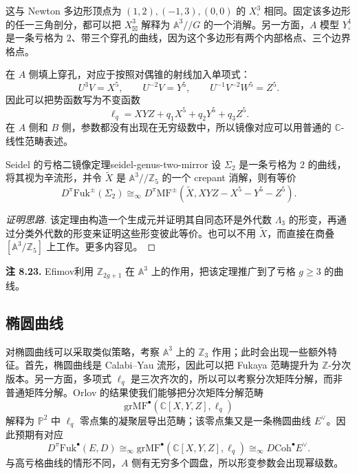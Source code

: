这与 Newton 多边形顶点为 $(1,2),(-1,3),(0,0)$ 的 $X^3_\square$ 相同。固定该多边形的任一三角剖分，都可以把 $X^3_{\boxtimes}$ 解释为 $\mathbb A^3//G$ 的一个消解。另一方面，$A$ 模型 $Y^1_\square$ 是一条亏格为 $2$、带三个穿孔的曲线，因为这个多边形有两个内部格点、三个边界格点。

在 $A$ 侧填上穿孔，对应于按照对偶锥的射线加入单项式：
\[
  U^3V=X^5,\qquad U^{-2}V=Y^5,\qquad
  U^{-1}V^{-2}W^5=Z^5.
\]
因此可以把势函数写为不变函数
\[
  \ell_q=XYZ+q_1X^5+q_2Y^5+q_3Z^5.
\]
在 $A$ 侧和 $B$ 侧，参数都没有出现在无穷级数中，所以镜像对应可以用普通的 $\mathbb C$-线性范畴表述。

\begin{theorem}{Seidel 的亏格二镜像定理}{seidel-genus-two-mirror}
设 $\Sigma_2$ 是一条亏格为 $2$ 的曲线，将其视为辛流形，并令 $\widetilde X$ 是 $\mathbb A^3//\mathbb Z_5$ 的一个 crepant 消解，则有等价
\[
  D^\pi\mathrm{Fuk}^{\pm}(\Sigma_2)
  \cong_\infty D^\pi\mathrm{MF}^{\pm}
  (\widetilde X,XYZ-X^5-Y^5-Z^5).
\]
\end{theorem}
\begin{proof}[证明思路]
该定理由构造一个生成元并证明其自同态环是外代数 $\Lambda_3$ 的形变，再通过分类外代数的形变来证明这些形变彼此等价。也可以不用 $\widetilde X$，而直接在商叠 $[\mathbb A^3/\mathbb Z_5]$ 上工作。更多内容见。
\end{proof}

\begin{note}\label{note:efimov-higher-genus}
\textbf{注 8.23.} Efimov利用 $\mathbb Z_{2g+1}$ 在 $\mathbb A^3$ 上的作用，把该定理推广到了亏格 $g\geq3$ 的曲线。
\end{note}

\subsection*{椭圆曲线}
对椭圆曲线可以采取类似策略，考察 $\mathbb A^3$ 上的 $\mathbb Z_3$ 作用；此时会出现一些额外特征。首先，椭圆曲线是 Calabi--Yau 流形，因此可以把 Fukaya 范畴提升为 $\mathbb Z$-分次版本。另一方面，多项式 $\ell_q$ 是三次齐次的，所以可以考察分次矩阵分解，而非普通矩阵分解。Orlov 的结果使我们能够把分次矩阵分解范畴
\[
  \mathrm{grMF}^{\bullet}(\mathbb C[X,Y,Z],\ell_q)
\]
解释为 $\mathbb P^2$ 中 $\ell_q$ 零点集的凝聚层导出范畴；该零点集又是一条椭圆曲线 $E^\vee$。因此预期有对应
\[
  D^\pi\mathrm{Fuk}^{\bullet}(E,D)
  \cong_\infty\mathrm{grMF}^{\bullet}(\mathbb C[X,Y,Z],\ell_q)
  \cong_\infty D\mathrm{Coh}^{\bullet}E^\vee.
\]
与高亏格曲线的情形不同，$A$ 侧有无穷多个圆盘，所以形变参数会出现幂级数。

